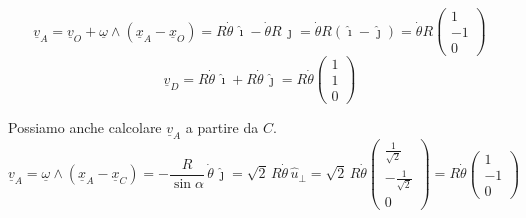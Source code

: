\begin{examplebreak}{}
\[
\underline{v}_A=\underline{v}_O+\underline{\omega}\wedge(\underline{x}_A-\underline{x}_O)
=R\dot{\theta}\,\hat{\imath}-\dot{\theta}R\,\hat{\jmath}
=\dot{\theta}R(\hat{\imath}-\hat{\jmath})
=
\dot{\theta}R
\begin{pmatrix}
1\\
-1\\
0
\end{pmatrix}
\]
\[
\underline{v}_D=R\dot{\theta}\,\hat{\imath}+R\dot{\theta}\,\hat{\jmath}
=
R\dot{\theta}
\begin{pmatrix}
1\\
1\\
0
\end{pmatrix}
\]

Possiamo anche calcolare $\underline{v}_A$ a partire da $C$.
\[
\underline{v}_A=
\underline{\omega}\wedge(\underline{x}_A-\underline{x}_C)
=
-\frac{R}{\sin\alpha}\,\dot{\theta}\,\hat{\jmath}
=
\sqrt{2}\,R\dot{\theta}\,\hat{u}_{\perp}
=
\sqrt{2}\,R\dot{\theta}
\begin{pmatrix}
\frac{1}{\sqrt{2}}\\[4pt]
-\frac{1}{\sqrt{2}}\\[4pt]
0
\end{pmatrix}
=
R\dot{\theta}
\begin{pmatrix}
1\\
-1\\
0
\end{pmatrix}
\]
\end{examplebreak}

